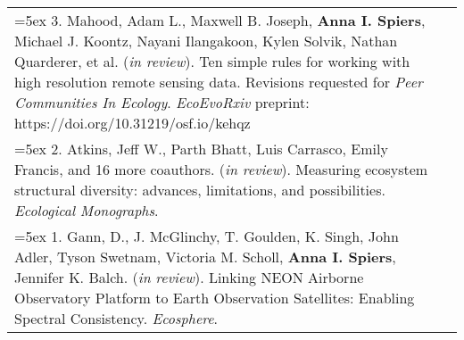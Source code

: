 \begin{longtable}{@{} >{\raggedright}p{6.10in} >{\raggedleft}X @{}}

\hangindent=5ex 3. Mahood, Adam L., Maxwell B. Joseph, \textbf{Anna I. Spiers}, Michael J. Koontz, Nayani Ilangakoon, Kylen Solvik, Nathan Quarderer, et al. (\emph{in review}). Ten simple rules for working with high resolution remote sensing data. Revisions requested for \emph{Peer Communities In Ecology}.
\newline \emph{EcoEvoRxiv} preprint: https://doi.org/10.31219/osf.io/kehqz & \tabularnewline

\hangindent=5ex 2. Atkins, Jeff W., Parth Bhatt, Luis Carrasco, Emily Francis, and 16 more coauthors. (\emph{in review}). Measuring ecosystem structural diversity: advances, limitations, and possibilities. \emph{Ecological Monographs}.  &  \tabularnewline

\hangindent=5ex 1. Gann, D., J. McGlinchy, T. Goulden, K. Singh, John Adler, Tyson Swetnam, Victoria M. Scholl, \textbf{Anna I. Spiers}, Jennifer K. Balch. (\emph{in review}). Linking NEON Airborne Observatory Platform to Earth Observation Satellites: Enabling Spectral Consistency. \emph{Ecosphere}.  & \tabularnewline


\end{longtable}

